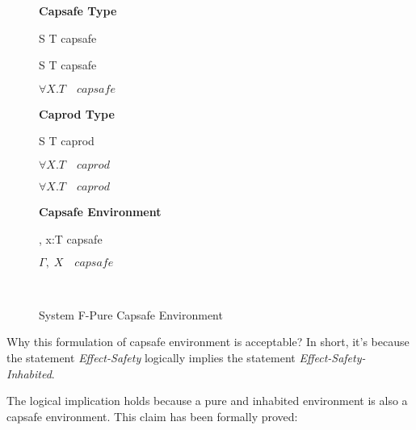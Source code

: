 \begin{figure}[h]
\begin{framed}

\setlength{\columnseprule}{0.4pt}
\begin{multicols}{2}

\textbf{Capsafe Type}


{ S \to T \quad capsafe }

{ S \to T \quad capsafe }

{ \colorbox{shade}{$\forall X.T \quad capsafe$} }

\columnbreak

\textbf{Caprod Type}


{ S \to T \quad caprod }

{ \colorbox{shade}{$\forall X.T \quad caprod$} }

{ \colorbox{shade}{$\forall X.T \quad caprod$} }

\textbf{Capsafe Environment}


{ \Gamma, \; x:T \quad capsafe }

{ \colorbox{shade}{$\Gamma, \; X \quad capsafe$} }

\hfill\\

\end{multicols}
\end{framed}

\caption{System F-Pure Capsafe Environment}
\label{fig:f-pure-capsafe-definition}
\end{figure}

Why this formulation of capsafe environment is acceptable? In short,
it's because the statement \emph{Effect-Safety} logically implies the
statement \emph{Effect-Safety-Inhabited}.

The logical implication holds because a pure and inhabited
environment is also a capsafe environment. This claim has been
formally proved:

